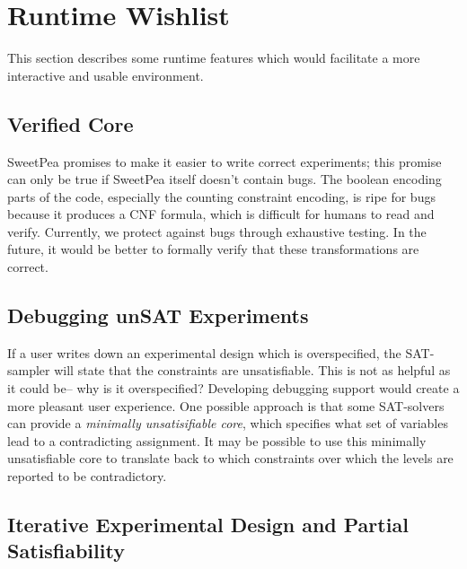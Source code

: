 

\section{Runtime Wishlist}

This section describes some runtime features which would facilitate a more interactive and usable environment.


\subsection{Verified Core}

SweetPea promises to make it easier to write correct experiments; this promise can only be true if SweetPea itself doesn't contain bugs. The boolean encoding parts of the code, especially the counting constraint encoding, is ripe for bugs because it produces a CNF formula, which is difficult for humans to read and verify. Currently, we protect against bugs through exhaustive testing. In the future, it would be better to formally verify that these transformations are correct.

\subsection{Debugging unSAT Experiments}

If a user writes down an experimental design which is overspecified, the SAT-sampler will state that the constraints are unsatisfiable. This is not as helpful as it could be-- why is it overspecified? Developing debugging support would create a more pleasant user experience. One possible approach is that some SAT-solvers can provide a \emph{minimally unsatisifiable core}, which specifies what set of variables lead to a contradicting assignment. It may be possible to use this minimally unsatisfiable core to translate back to which constraints over which the levels are reported to be contradictory.

\subsection{Iterative Experimental Design and Partial Satisfiability}

